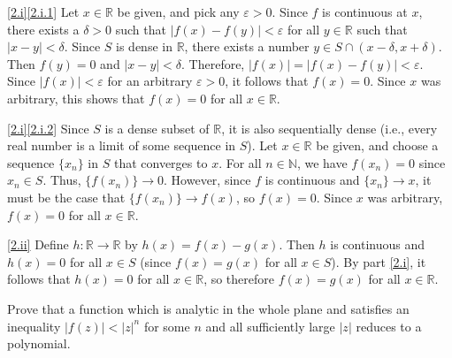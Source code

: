 \documentclass{homework}
\begin{document}
\begin{solution}
\ref{2.i}\ref{2.i.1}
Let $x \in \mathbb R$ be given, and pick any $\varepsilon > 0$.
Since $f$ is continuous at $x$, there exists a $\delta > 0$ such that
$|f(x) - f(y)| < \varepsilon$ for all $y \in \mathbb R$ such that
$|x - y| < \delta$.
Since $S$ is dense in $\mathbb R$, there exists a number
$y \in S \cap (x - \delta, x + \delta)$.
Then $f(y) = 0$ and $|x - y| < \delta$.
Therefore, $|f(x)| = |f(x) - f(y)| < \varepsilon$.
Since $|f(x)| < \varepsilon$ for an arbitrary $\varepsilon > 0$, it follows that
$f(x) = 0$.
Since $x$ was arbitrary, this shows that $f(x) = 0$ for all $x \in \mathbb R$.

\ref{2.i}\ref{2.i.2}
Since $S$ is a dense subset of $\mathbb R$, it is also sequentially dense (i.e.,
every real number is a limit of some sequence in $S$).
Let $x \in \mathbb R$ be given, and choose a sequence $\{x_n\}$ in $S$ that
converges to $x$.
For all $n \in \mathbb N$, we have $f(x_n) = 0$ since $x_n \in S$.
Thus, $\{f(x_n)\} \to 0$.
However, since $f$ is continuous and $\{x_n\} \to x$, it must be the case that
$\{f(x_n)\} \to f(x)$, so $f(x) = 0$.
Since $x$ was arbitrary, $f(x) = 0$ for all $x \in \mathbb R$.

\ref{2.ii}
Define $h : \mathbb R \to \mathbb R$ by $h(x) = f(x) - g(x)$.
Then $h$ is continuous and $h(x) = 0$ for all $x \in S$ (since $f(x) = g(x)$ for
all $x \in S$).
By part \eqref{2.i}, it follows that $h(x) = 0$ for all $x \in \mathbb R$, so
therefore $f(x) = g(x)$ for all $x \in \mathbb R$.
\end{solution}

\begin{problem}[Ahlfors \S4.2.3 \#2, p. 123]
Prove that a function which is analytic in the whole plane and satisfies an
inequality $|f(z)| < |z|^n$ for some $n$ and all sufficiently large $|z|$
reduces to a polynomial.
\end{problem}
\end{document}
